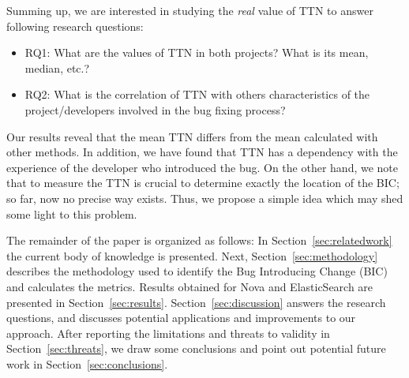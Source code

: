 \documentclass[10pt, conference]{IEEEtran}
\begin{document}
Summing up, we are interested in studying the \emph{real} value of TTN to answer following research questions:
\begin{itemize}
  \item RQ1: What are the values of TTN in both projects? What is its mean, median, etc.?
  \item RQ2: What is the correlation of TTN with others characteristics of the project/developers involved in the bug fixing process? 
\end{itemize}

Our results reveal that the mean TTN differs from the mean calculated with other methods. In addition, we have found that TTN has a dependency with the experience of the developer who introduced the bug. On the other hand, we note that to measure the TTN is crucial to determine exactly the location of the BIC; so far, now no precise way exists. Thus, we propose a simple idea which may shed some light to this problem.


The remainder of the paper is organized as follows: In Section~\ref{sec:relatedwork} the current body of knowledge is presented. Next, Section~\ref{sec:methodology} describes the methodology used to identify the Bug Introducing Change (BIC) and calculates the metrics. Results obtained for Nova and ElasticSearch are presented in Section~\ref{sec:results}. Section~\ref{sec:discussion} answers the research questions, and discusses potential applications and improvements to our approach. After reporting the limitations and threats to validity in Section~\ref{sec:threats}, we draw some conclusions and point out potential future work in Section~\ref{sec:conclusions}.
\end{document}
